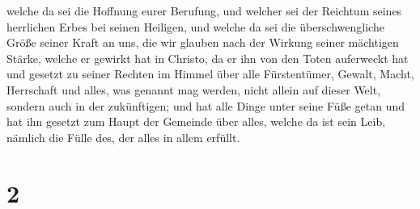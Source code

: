 welche da sei die Hoffnung eurer Berufung, und welcher sei der Reichtum
seines herrlichen Erbes bei seinen Heiligen,  und welche da
sei die überschwengliche Größe seiner Kraft an uns, die wir glauben nach
der Wirkung seiner mächtigen Stärke,  welche er gewirkt hat
in Christo, da er ihn von den Toten auferweckt hat und gesetzt zu seiner
Rechten im Himmel  über alle Fürstentümer, Gewalt, Macht,
Herrschaft und alles, was genannt mag werden, nicht allein auf dieser
Welt, sondern auch in der zukünftigen;  und hat alle Dinge
unter seine Füße getan und hat ihn gesetzt zum Haupt der Gemeinde über
alles,  welche da ist sein Leib, nämlich die Fülle des, der
alles in allem erfüllt.

\hypertarget{section-1}{%
\section{2}\label{section-1}}

